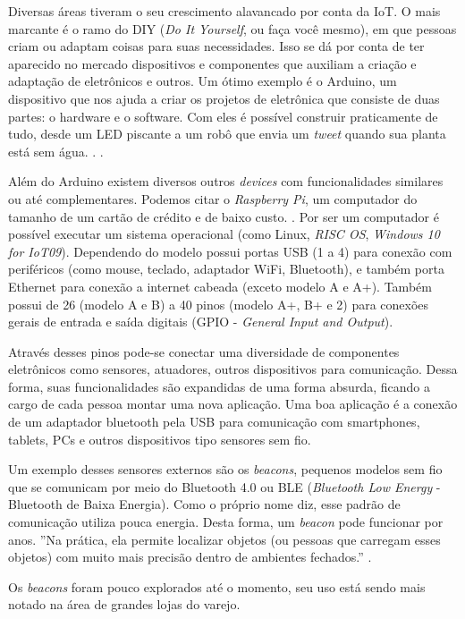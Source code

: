 \documentclass[
		12pt,				%
		openright,			%
		oneside,			%
		a4paper,			%
		chapter=TITLE,		%
		english,			%
		brazil				%
	]{abntex2}
\begin{document}
Diversas áreas tiveram o seu crescimento alavancado por conta da IoT. O mais marcante é o ramo do DIY (\textit{Do It Yourself}, ou faça você mesmo), em que pessoas criam ou adaptam coisas para suas necessidades. Isso se dá por conta de ter aparecido no mercado dispositivos e componentes que auxiliam a criação e adaptação de eletrônicos e outros. Um ótimo exemplo é o Arduino, um dispositivo que nos ajuda a criar os projetos de eletrônica que consiste de duas partes: o hardware e o software. Com eles é possível construir praticamente de tudo, desde um LED piscante a um robô que envia um \textit{tweet} quando sua planta está sem água. \cite{ben-arduino}. \cite{sorrel-arduino}.

Além do Arduino existem diversos outros \textit{devices} com funcionalidades similares ou até complementares. Podemos citar o \textit{Raspberry Pi}, um computador do tamanho de um cartão de crédito e de baixo custo. \cite{raspberrypi-rpi}. Por ser um computador é possível executar um sistema operacional (como Linux, \textit{RISC OS}, \textit{Windows 10 for IoT09}). Dependendo do modelo possui portas USB (1 a 4) para conexão com periféricos (como mouse, teclado, adaptador WiFi, Bluetooth), e também porta Ethernet para conexão a internet cabeada (exceto modelo A e A+). Também possui de 26 (modelo A e B) a 40 pinos (modelo A+, B+ e 2) para conexões gerais de entrada e saída digitais (GPIO - \textit{General Input and Output}). 

Através desses pinos pode-se conectar uma diversidade de componentes eletrônicos como sensores, atuadores, outros dispositivos para comunicação. Dessa forma, suas funcionalidades são expandidas de uma forma absurda, ficando a cargo de cada pessoa montar uma nova aplicação. Uma boa aplicação é a conexão de um adaptador bluetooth pela USB para comunicação com smartphones, tablets, PCs e outros dispositivos tipo sensores sem fio.

Um exemplo desses sensores externos são os \textit{beacons}, pequenos modelos sem fio que se comunicam por meio do Bluetooth 4.0 ou BLE (\textit{Bluetooth Low Energy} - Bluetooth de Baixa Energia). Como o próprio nome diz, esse padrão de comunicação utiliza pouca energia. Desta forma, um \textit{beacon} pode funcionar por anos. ''Na prática, ela permite localizar objetos (ou pessoas que carregam esses objetos) com muito mais precisão dentro de ambientes fechados.'' \cite{teixeira-beacon}.

Os \textit{beacons} foram pouco explorados até o momento, seu uso está sendo mais notado na área de grandes lojas do varejo.
\end{document}
